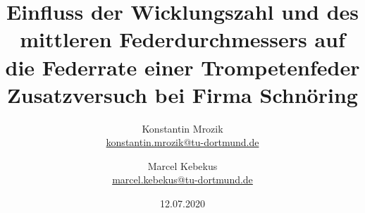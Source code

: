 

\title{Einfluss der Wicklungszahl und des mittleren Federdurchmessers auf die 
Federrate einer Trompetenfeder\\\small{Zusatzversuch bei Firma Schnöring}}
\author{%
  Konstantin Mrozik\\%
  \href{mailto:konstantin.mrozik@tu-dortmund.de}{konstantin.mrozik@tu-dortmund.de}%
  \and%
  Marcel Kebekus\\%
  \href{mailto:marcel.kebekus@tu-dortmund.de}{marcel.kebekus@tu-dortmund.de}%
}
\date{%
  12.07.2020 
}
\publishers{TU Dortmund – Fakultät Physik}
\makeatletter         
\def\@maketitle{
\raggedright
\texttt{[image: bilder/tud\_logo\_rgb.jpg]}\\[8ex]
\begin{center}
{\Huge \bfseries \sffamily \@title }\\[4ex] 
{\Large  \@author}\\[4ex] 
\@date\\[8ex]
\publishers\\
\end{center}}
\makeatother





\maketitle
\thispagestyle{empty}
\tableofcontents
\newpage





\nocite{}
\printbibliography



